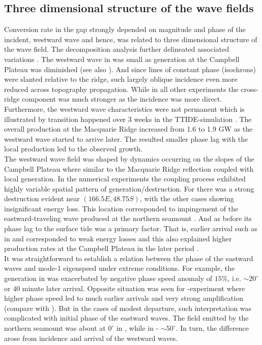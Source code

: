 \documentclass[12pt]{article}
\begin{document}
\subsection{Three dimensional structure of the wave fields}
\label{C3.sec:3d_var}
Conversion rate in the gap strongly depended on magnitude and phase of the incident, westward wave 
and 
hence, was related to three dimensional structure of the wave field. The decomposition analysis 
further delineated associated variations . The westward wave in 
 was small as generation at the Campbell Plateau was diminished (see also 
). And since lines of constant phase (isochrons) were slanted relative to the 
ridge, such 
largely oblique incidence even more reduced across topography propagation. While in all other 
experiments the cross-ridge component was much stronger as the incidence was more direct. 
Furthermore, the westward wave characteristics were not permanent which is illustrated 
by 
transition happened over 3 weeks in the TTIDE-simulation . The 
overall 
production at the Macquarie Ridge increased from 1.6 to 1.9 GW  as the 
westward 
wave started to arrive later. The resulted smaller phase lag with the local production led to the 
observed growth.\\

The westward wave field was shaped by dynamics occurring on the slopes of the Campbell 
Plateau where similar to the Macquarie Ridge reflection coupled with local generation. In the 
numerical experiments the coupling process exhibited highly variable spatial pattern of 
generation/destruction. For  there was a strong destruction evident near $(166.5E, 
48.75S)$,  with the other cases showing insignificant energy loss. 
This 
location corresponded to impingement of the eastward-traveling wave produced at the northern 
seamount . And as before its phase lag to the surface  
tide 
was a primary factor. That is, earlier arrival such as in  and  
corresponded to weak energy losses and this also explained higher production rates at the 
Campbell 
Plateau in the later period .\\

It was straightforward to establish a relation between the phase of the eastward waves and mode-1 
eigenspeed under extreme conditions. For example, the generation in  was   
exacerbated by negative phase speed anomaly of $15\%$, i.e. $\sim 20^{\circ}$ or 
$40$ minute later arrival. Opposite situation was seen for -experiment where higher 
phase speed led to much earlier arrivals and very strong amplification (compare 
 with ). But in the 
cases of modest departure, such interpretation was complicated with initial phase of the 
eastward waves. The field emitted by the northern seamount was about at $0^{\circ}$ in 
, while in  - $\sim 50^{\circ}$. In turn, the difference 
arose from incidence and arrival of the westward waves.\\
\end{document}
